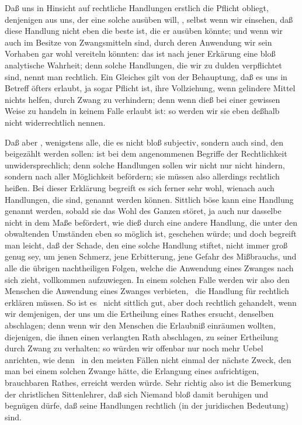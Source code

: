 \begin{aufza}
\item Daß uns in Hinsicht auf rechtliche Handlungen erstlich die Pflicht obliegt, denjenigen aus uns, der eine solche ausüben will, , selbst wenn wir einsehen, daß diese Handlung nicht eben die beste ist, die er ausüben könnte; und wenn wir auch im Besitze von Zwangsmitteln sind, durch deren Anwendung wir sein Vorhaben gar wohl vereiteln könnten: das ist nach jener Erkärung eine bloß analytische Wahrheit; denn solche Handlungen, die wir zu dulden verpflichtet sind, nennt man rechtlich. Ein Gleiches gilt von der Behauptung, daß es uns in Betreff  öfters erlaubt, ja sogar Pflicht ist, ihre Vollziehung, wenn gelindere Mittel nichts helfen, durch Zwang zu verhindern; denn wenn dieß bei einer gewissen Weise zu handeln in keinem Falle erlaubt ist: so werden wir sie eben deßhalb nicht widerrechtlich nennen.
\item Daß aber , wenigstens alle, die es nicht bloß subjectiv, sondern auch  sind, den  beigezählt werden sollen: ist bei dem angenommenen Begriffe der Rechtlichkeit unwidersprechlich; denn solche Handlungen sollen wir nicht nur nicht hindern, sondern nach aller Möglichkeit befördern; sie müssen also allerdings rechtlich heißen. Bei dieser Erklärung begreift es sich ferner sehr wohl, wienach auch Handlungen, die  sind,  genannt werden können. Sittlich böse kann eine Handlung genannt werden, sobald sie das Wohl des Ganzen störet, ja auch nur dasselbe nicht in dem Maße befördert, wie dieß durch eine andere Handlung, die unter den obwaltenden Umständen eben so möglich ist, geschehen würde; und doch begreift man leicht, daß der Schade, den eine solche Handlung stiftet, nicht immer groß genug sey, um jenen Schmerz, jene Erbitterung, jene Gefahr des Mißbrauchs, und alle die übrigen nachtheiligen Folgen, welche die Anwendung eines Zwanges nach sich zieht, vollkommen aufzuwiegen. In einem solchen Falle werden wir also den Menschen die Anwendung eines Zwanges verbieten, \dh\  die Handlung für rechtlich erklären müssen. So ist es \zB\  nicht sittlich gut, aber doch rechtlich gehandelt, wenn wir demjenigen, der uns um die Ertheilung eines Rathes ersucht, denselben abschlagen; denn wenn wir den Menschen die Erlaubniß einräumen wollten, diejenigen, die ihnen einen verlangten Rath abschlagen, zu seiner Ertheilung durch Zwang zu verhalten: so würden wir offenbar nur noch mehr Uebel anrichten, wie denn \zB\  in den meisten Fällen nicht einmal der nächste Zweck, den man bei einem solchen Zwange hätte, die Erlangung eines aufrichtigen, brauchbaren Rathes, erreicht werden würde. Sehr richtig also ist die Bemerkung der christlichen Sittenlehrer, daß sich Niemand bloß damit beruhigen und begnügen dürfe, daß seine Handlungen rechtlich (in der juridischen Bedeutung) sind.

\end{aufza}
